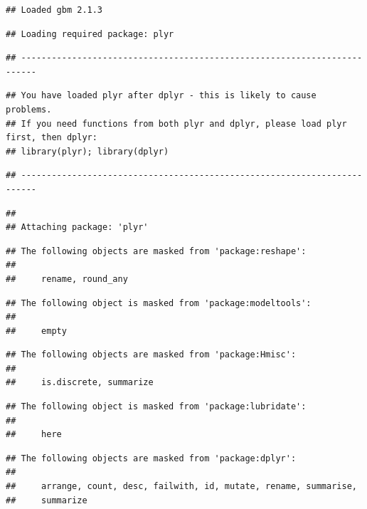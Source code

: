 \documentclass[]{book}
\begin{document}
\begin{verbatim}
## Loaded gbm 2.1.3
\end{verbatim}

\begin{verbatim}
## Loading required package: plyr
\end{verbatim}

\begin{verbatim}
## -------------------------------------------------------------------------
\end{verbatim}

\begin{verbatim}
## You have loaded plyr after dplyr - this is likely to cause problems.
## If you need functions from both plyr and dplyr, please load plyr first, then dplyr:
## library(plyr); library(dplyr)
\end{verbatim}

\begin{verbatim}
## -------------------------------------------------------------------------
\end{verbatim}

\begin{verbatim}
## 
## Attaching package: 'plyr'
\end{verbatim}

\begin{verbatim}
## The following objects are masked from 'package:reshape':
## 
##     rename, round_any
\end{verbatim}

\begin{verbatim}
## The following object is masked from 'package:modeltools':
## 
##     empty
\end{verbatim}

\begin{verbatim}
## The following objects are masked from 'package:Hmisc':
## 
##     is.discrete, summarize
\end{verbatim}

\begin{verbatim}
## The following object is masked from 'package:lubridate':
## 
##     here
\end{verbatim}

\begin{verbatim}
## The following objects are masked from 'package:dplyr':
## 
##     arrange, count, desc, failwith, id, mutate, rename, summarise,
##     summarize
\end{verbatim}
\end{document}
